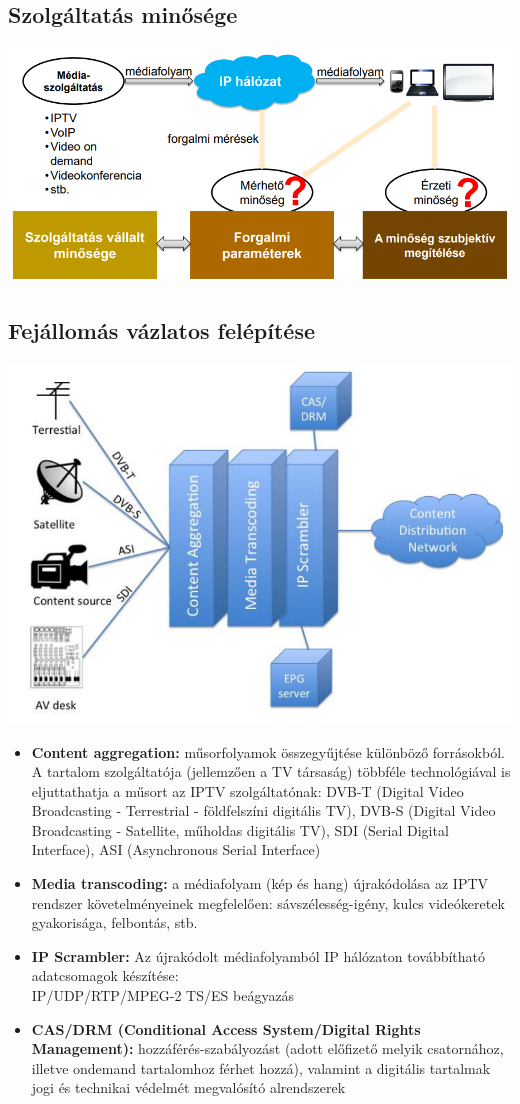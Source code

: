 \documentclass[10pt,a4paper]{article}
\begin{document}
\subsection{Szolgáltatás minősége}
\begin{center}
	\includegraphics[width=0.6\linewidth]{src/Mediaminoseg}
\end{center}
\subsection{Fejállomás vázlatos felépítése}
\begin{center}
	\includegraphics[width=0.6\linewidth]{src/IPTVarch}
\end{center}
\begin{itemize}
	\item \textbf{Content aggregation:} műsorfolyamok összegyűjtése különböző forrásokból.
	A tartalom szolgáltatója (jellemzően a TV társaság) többféle technológiával
	is eljuttathatja a műsort az IPTV szolgáltatónak: DVB-T (Digital Video
	Broadcasting - Terrestrial - földfelszíni digitális TV), DVB-S (Digital Video
	Broadcasting - Satellite, műholdas digitális TV), SDI (Serial Digital
	Interface), ASI (Asynchronous Serial Interface)
	\item \textbf{Media transcoding:} a médiafolyam (kép és hang) újrakódolása az IPTV
	rendszer követelményeinek megfelelően: sávszélesség-igény, kulcs
	videókeretek gyakorisága, felbontás, stb.
	\item \textbf{IP Scrambler:} Az újrakódolt médiafolyamból IP hálózaton továbbítható
	adatcsomagok készítése: \\IP/UDP/RTP/MPEG-2 TS/ES beágyazás
	\item \textbf{CAS/DRM (Conditional Access System/Digital Rights Management):}
	hozzáférés-szabályozást (adott előfizető melyik csatornához, illetve ondemand tartalomhoz férhet hozzá), valamint a digitális tartalmak jogi és
	technikai védelmét megvalósító alrendszerek
\end{itemize}
\end{document}

